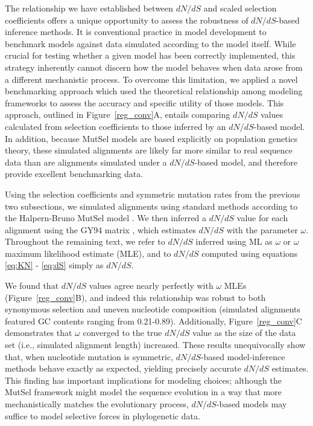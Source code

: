 \documentclass{pnastwo}
\begin{document}
\begin{article}
The relationship we have established between $dN/dS$ and scaled selection coefficients offers a unique opportunity to assess the robustness of $dN/dS$-based inference methods. It is conventional practice in model development to benchmark models against data simulated according to the model itself. While crucial for testing whether a given model has been correctly implemented, this strategy inherently cannot discern how the model behaves when data arose from a different mechanistic process. To overcome this limitation, we applied a novel benchmarking approach which used the theoretical relationship among modeling frameworks to assess the accuracy and specific utility of those models. This approach, outlined in Figure~\ref{reg_conv}A, entails comparing $dN/dS$ values calculated from selection coefficients to those inferred by an $dN/dS$-based model. In addition, because MutSel models are based explicitly on population genetics theory, these simulated alignments are likely far more similar to real sequence data than are alignments simulated under a $dN/dS$-based model, and therefore provide excellent benchmarking data.

Using the selection coefficients and symmetric mutation rates from the previous two subsections, we simulated alignments using standard methods \cite{Yang2006} according to the Halpern-Bruno MutSel model \cite{HalpernBruno1998}. We then inferred a $dN/dS$ value for each alignment using the GY94 matrix \cite{GoldmanYang1994,NielsenYang1998}, which estimates $dN/dS$ with the parameter $\omega$. Throughout the remaining text, we refer to $dN/dS$ inferred using ML as $\omega$ or $\omega$ maximum likelihood estimate (MLE), and to $dN/dS$ computed using equations \eqref{eq:KN} - \eqref{eq:dS} simply as $dN/dS$. 

We found that $dN/dS$ values agree nearly perfectly with $\omega$ MLEs (Figure~\ref{reg_conv}B), and indeed this relationship was robust to both synonymous selection and uneven nucleotide composition (simulated alignments featured GC contents ranging from 0.21-0.89). Additionally, Figure~\ref{reg_conv}C demonstrates that $\omega$ converged to the true $dN/dS$ value as the size of the data set (i.e., simulated alignment length) increased. These results unequivocally show that, when nucleotide mutation is symmetric,  $dN/dS$-based model-inference methods behave exactly as expected, yielding precisely accurate $dN/dS$ estimates. This finding has important implications for modeling choices; although the MutSel framework might model the sequence evolution in a way that more mechanistically matches the evolutionary process, $dN/dS$-based models may suffice to model selective forces in phylogenetic data.



\end{article}
\end{document}
